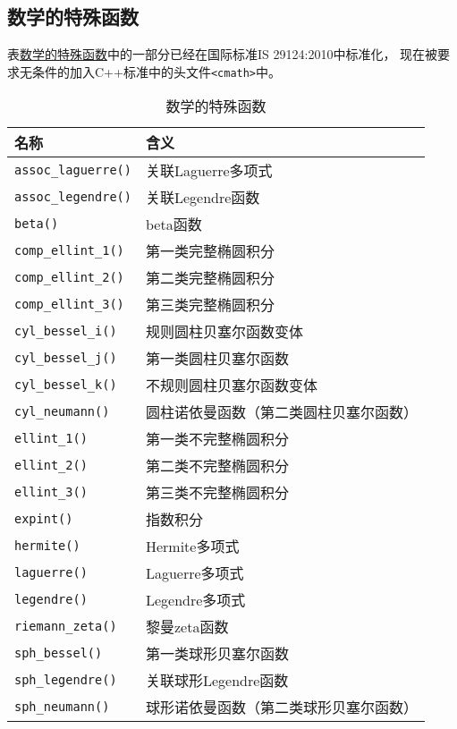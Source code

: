 \subsection{数学的特殊函数}
表\hyperref[t28.1]{数学的特殊函数}中的一部分已经在国际标准IS 29124:2010中标准化，
现在被要求无条件的加入C++标准中的头文件\texttt{<cmath>}中。
\begin{table}[htb]
    \centering
    \begin{tabular}{l|l}
        \hline
        \textbf{名称}              &            \textbf{含义} \\
        \hline
        \texttt{assoc\_laguerre()} & 关联Laguerre多项式       \\
        \texttt{assoc\_legendre()} & 关联Legendre函数        \\
        \texttt{beta()}            & beta函数              \\
        \texttt{comp\_ellint\_1()} & 第一类完整椭圆积分           \\
        \texttt{comp\_ellint\_2()} & 第二类完整椭圆积分           \\
        \texttt{comp\_ellint\_3()} & 第三类完整椭圆积分           \\
        \texttt{cyl\_bessel\_i()}  & 规则圆柱贝塞尔函数变体         \\
        \texttt{cyl\_bessel\_j()}  & 第一类圆柱贝塞尔函数          \\
        \texttt{cyl\_bessel\_k()}  & 不规则圆柱贝塞尔函数变体        \\
        \texttt{cyl\_neumann()}    & 圆柱诺依曼函数（第二类圆柱贝塞尔函数） \\
        \texttt{ellint\_1()}       & 第一类不完整椭圆积分          \\
        \texttt{ellint\_2()}       & 第二类不完整椭圆积分          \\
        \texttt{ellint\_3()}       & 第三类不完整椭圆积分          \\
        \texttt{expint()}          & 指数积分                \\
        \texttt{hermite()}         & Hermite多项式          \\
        \texttt{laguerre()}        & Laguerre多项式         \\
        \texttt{legendre()}        & Legendre多项式         \\
        \texttt{riemann\_zeta()}   & 黎曼zeta函数            \\
        \texttt{sph\_bessel()}     & 第一类球形贝塞尔函数          \\
        \texttt{sph\_legendre()}   & 关联球形Legendre函数      \\
        \texttt{sph\_neumann()}    & 球形诺依曼函数（第二类球形贝塞尔函数） \\
        \hline
    \end{tabular}
    \caption{数学的特殊函数}
    \label{t28.1}
\end{table}

